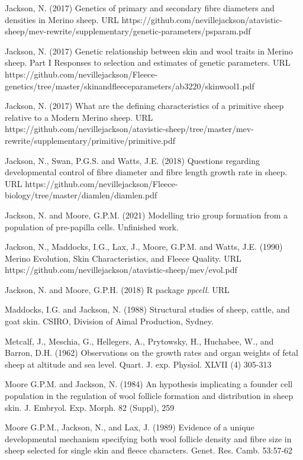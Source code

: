 \documentclass[titlepage]{article}  %
\begin{document}
\begin{thebibliography}{}
Jackson, N. (2017) Genetics of primary and secondary fibre diameters and densities in Merino sheep. URL https://github.com/nevillejackson/atavistic-sheep/mev-rewrite/supplementary/genetic-parameters/psparam.pdf

Jackson, N. (2017) Genetic relationship between skin and wool traits in Merino sheep. Part I Responses to selection and estimates of genetic parameters. URL https://github.com/nevillejackson/Fleece-genetics/tree/master/skinandfleeceparameters/ab3220/skinwool1.pdf

Jackson, N. (2017) What are the defining characteristics of a primitive sheep relative to a Modern Merino sheep.  URL https://github.com/nevillejackson/atavistic-sheep/tree/master/mev-rewrite/supplementary/primitive/primitive.pdf

Jackson, N., Swan, P.G.S. and Watts, J.E. (2018) Questions regarding developmental control of fibre diameter and fibre length growth rate in sheep. URL https://github.com/nevillejackson/Fleece-biology/tree/master/diamlen/diamlen.pdf

Jackson, N. and Moore, G.P.M. (2021) Modelling trio group formation from a population of pre-papilla cells. Unfinished work.

Jackson, N., Maddocks, I.G., Lax, J., Moore, G.P.M. and Watts, J.E. (1990) Merino Evolution, Skin Characteristics, and Fleece Quality. URL https://github.com/nevillejackson/atavistic-sheep/mev/evol.pdf 

Jackson, N. and Moore, G.P.H. (2018) R package {\em ppcell}. URL

Maddocks, I.G. and Jackson, N. (1988) Structural studies of sheep, cattle, and goat skin. CSIRO, Division of Aimal Production, Sydney.

Metcalf, J., Meschia, G., Hellegers, A., Prytowsky, H., Huchabee, W., and Barron, D.H. (1962) Observations on the growth rates and organ weights of fetal sheep at altitude and sea level. Quart. J. exp. Physiol. XLVII (4) 305-313

Moore G.P.M. and Jackson, N. (1984) An hypothesis implicating a founder cell population in the regulation of wool follicle formation and distribution in sheep skin. J. Embryol. Exp. Morph. 82 (Suppl), 259

Moore G.P.M., Jackson, N., and Lax, J. (1989) Evidence of a unique developmental mechanism specifying both wool follicle density and fibre size in sheep selected for single skin and fleece characters. Genet. Res. Camb. 53:57-62


\end{thebibliography}
\end{document}
